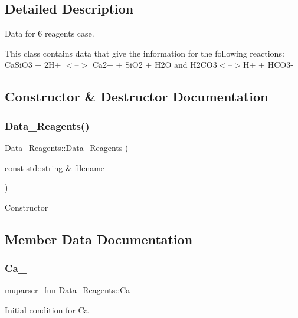 \subsection{Detailed Description}
Data for 6 reagents case. 

This class contains data that give the information for the following reactions\+: Ca\+Si\+O3 + 2\+H+ $<$--$>$ Ca2+ + Si\+O2 + H2O and H2\+C\+O3$<$--$>$H+ + H\+C\+O3-\/ 

\subsection{Constructor \& Destructor Documentation}
\mbox{\label{classData__6Reagents_a5a222af278c0506507fd868cbb8f4c55}} 
\subsubsection{\texorpdfstring{Data\+\_\+Reagents()}{Data\_6Reagents()}}
{\footnotesize\ttfamily Data\+\_\+Reagents\+::\+Data\+\_\+Reagents (\begin{DoxyParamCaption}\item[{const std\+::string \&}]{filename }\end{DoxyParamCaption})\hspace{0.3cm}{\ttfamily [explicit]}}

Constructor 

\subsection{Member Data Documentation}
\mbox{\label{classData__6Reagents_ac22e837369542165f3e3aa81022e6757}} 
\subsubsection{\texorpdfstring{Ca\+\_}{Ca\_0}}
{\footnotesize\ttfamily \hyperlink{classmuparser__fun}{muparser\+\_\+fun} Data\+\_\+Reagents\+::\+Ca\+\_}

Initial condition for Ca \mbox{\label{classData__6Reagents_a3dfd54ceaf5be9ed6aed54997df5d85a}} 
